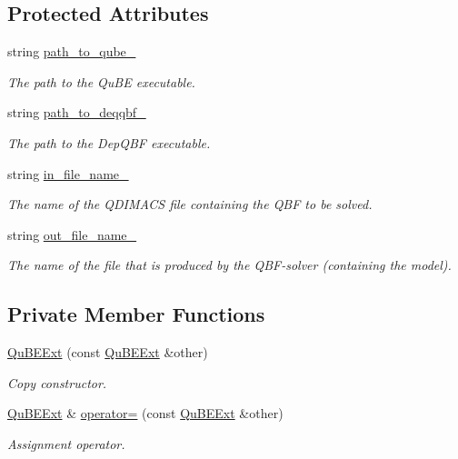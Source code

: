 \subsection*{Protected Attributes}
\begin{DoxyCompactItemize}
\item 
string \hyperlink{classQuBEExt_a02646118beb978edff16fc0094a798f8}{path\-\_\-to\-\_\-qube\-\_\-}
\begin{DoxyCompactList}\small\item\em The path to the Qu\-B\-E executable. \end{DoxyCompactList}\item 
string \hyperlink{classQuBEExt_aed89db58647a80a6204798720ec136df}{path\-\_\-to\-\_\-deqqbf\-\_\-}
\begin{DoxyCompactList}\small\item\em The path to the Dep\-Q\-B\-F executable. \end{DoxyCompactList}\item 
string \hyperlink{classExtQBFSolver_a04d2ff483c22a11344e46d66ae7e76b1}{in\-\_\-file\-\_\-name\-\_\-}
\begin{DoxyCompactList}\small\item\em The name of the Q\-D\-I\-M\-A\-C\-S file containing the Q\-B\-F to be solved. \end{DoxyCompactList}\item 
string \hyperlink{classExtQBFSolver_a0efb35aa9b807dec521ad3406eaf664d}{out\-\_\-file\-\_\-name\-\_\-}
\begin{DoxyCompactList}\small\item\em The name of the file that is produced by the Q\-B\-F-\/solver (containing the model). \end{DoxyCompactList}\end{DoxyCompactItemize}
\subsection*{Private Member Functions}
\begin{DoxyCompactItemize}
\item 
\hyperlink{classQuBEExt_aee6b5faa4e71bef7df5f0961f8de31d7}{Qu\-B\-E\-Ext} (const \hyperlink{classQuBEExt}{Qu\-B\-E\-Ext} \&other)
\begin{DoxyCompactList}\small\item\em Copy constructor. \end{DoxyCompactList}\item 
\hyperlink{classQuBEExt}{Qu\-B\-E\-Ext} \& \hyperlink{classQuBEExt_ae9f834011d3dd5ef0452b70052e10bd0}{operator=} (const \hyperlink{classQuBEExt}{Qu\-B\-E\-Ext} \&other)
\begin{DoxyCompactList}\small\item\em Assignment operator. \end{DoxyCompactList}\end{DoxyCompactItemize}


